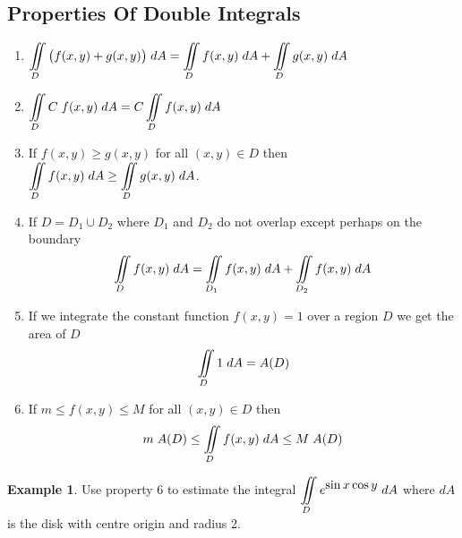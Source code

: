 \documentclass[11pt,a4paper]{article}
\theoremstyle{definition}
\newtheorem{exa}[thm]{Example}
\begin{document}
{\color[wave]{485}\subsection{Properties Of Double Integrals}}
\begin{enumerate}
\item $\displaystyle{\iint\limits_D \big(f(x,y) + g(x,y)\big)\hspace{0.1cm}dA = \iint\limits_D f(x,y)\hspace{0.1cm}dA   +   \iint\limits_D g(x,y)\hspace{0.1cm}dA}$

\item $\displaystyle{ \iint\limits_D C\hspace{0.1cm} f(x,y)\hspace{0.1cm}dA  = C \iint\limits_D f(x,y)\hspace{0.1cm}dA }$

\item If $f(x,y)\geq g(x,y)$ for all $(x,y)\in D$ then $\displaystyle{\iint\limits_D f(x,y)\hspace{0.1cm}dA \geq \iint\limits_D g(x,y)\hspace{0.1cm}dA }$.
\item If $D = D_1\cup D_2$ where $D_1$ and $D_2$ do not overlap except perhaps on the boundary $$\iint\limits_D f(x,y)\hspace{0.1cm}dA  = \iint\limits_{D_1} f(x,y)\hspace{0.1cm}dA  + \iint\limits_{D_2} f(x,y)\hspace{0.1cm}dA $$
\item If we integrate the constant function $f(x,y) = 1$ over a region $D$ we get the area of $D$ $$\iint\limits_D 1 \hspace{0.1cm}dA = A(D)$$
\item If $m\leq f(x,y) \leq M$ for all $(x,y) \in D$ then $$m\hspace{0.1cm}A(D)\leq \iint\limits_D f(x,y)\hspace{0.1cm}dA \leq M\hspace{0.1cm} A(D)$$
\end{enumerate}

\begin{exa}


Use property 6 to estimate the integral $\displaystyle{\iint\limits_De^{\displaystyle{\sin x \cos y}}\hspace{0.1cm} dA}$ where $dA$ is the disk with centre origin and radius 2.
\end{exa}
\end{document}
